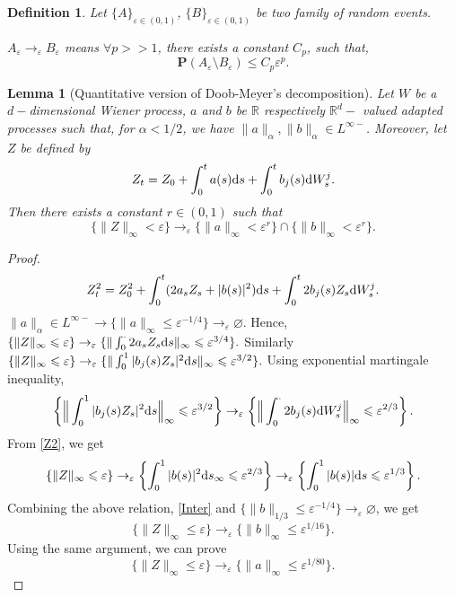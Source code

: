 \documentclass[twoside, 12pt]{book}
\numberwithin{equation}{chapter}
\newtheorem{lemma}[theorem]{Lemma}
\newtheorem{definition}[theorem]{Definition}
\def\mR{{\mathbb R}}
\def\bP{{\mathbf P}}
\def\leq{\leqslant}
\def\d{\text{\rm{d}}}
\def\eps{\varepsilon}
\begin{document}
	
	\begin{definition}
	Let $\{A\}_{\eps\in(0,1)}$, $\{B\}_{\eps\in(0,1)}$ be two family of random events. 
	
	$A_\eps \rightarrow_\eps B_\eps$ means $\forall p>>1$, there exists a constant $C_p$, such that, 
	$$\bP (A_\eps\setminus B_\eps)\leq C_p\eps^p. $$
	\end{definition}
	
	
	\begin{lemma}[Quantitative version of Doob-Meyer's decomposition]\label{Z-to-ab}
	Let $W$ be a $d-$dimensional Wiener process, $a$ and $b$ be $\mR$ respectively $\mR^d-$ valued adapted processes such that, for $\alpha <1/2$, we have $\|a\|_\alpha , \|b\|_\alpha \in L^{\infty-}$. Moreover, let $Z$ be defined by
	$$Z_t=Z_0+\int_0^t a(s)\d s+\int_0^t b_j(s)\d W^j_s. $$
	Then there exists a constant $r\in(0, 1)$ such that
	$$\{\|Z\|_\infty<\eps\} \rightarrow_\eps \{\|a\|_\infty<\eps^r\} \cap\{\|b\|_{\infty}< \eps^r\} .$$
	\end{lemma}
	\begin{proof}
		\begin{align}\label{Z2} Z_t^2=Z_0^2+\int_0^t (2a_sZ_s+|b(s)|^2)\d s+\int_0^t 2b_j(s) Z_s\d W^j_s. \end{align}
		$\|a\|_\alpha \in L^{\infty-}\rightarrow \{\|a\|_\infty\leq \eps^{-1/4}\}\rightarrow_\eps\varnothing. $ Hence, $\{ \|Z\|_\infty\leq \eps\}\rightarrow_\eps \{\|\int_0^\cdot 2a_sZ_s\d s\|_\infty \leq \eps^{3/4}\}. $ Similarly 
		$\{ \|Z\|_\infty\leq \eps\}\rightarrow_\eps \{\|\int_0^1 |b_j(s)Z_s|^2 \d s\|_\infty \leq \eps^{3/2}\}.$ Using exponential martingale inequality, 
		$$\left\{\Big\|\int_0^1 |b_j(s)Z_s|^2 \d s\Big\|_\infty  \leq \eps^{3/2}\right\}\rightarrow_\eps \left\{ \Big\|\int_0^\cdot  2b_j(s)\d W^j_s\Big\|_\infty \leq \eps^{2/3}\right\}. $$
		From \eqref{Z2}, we get 
		$$\{ \|Z\|_\infty\leq \eps\}\rightarrow_\eps \left\{\int_0^1 |b(s)|^2\d s_\infty\leq \eps^{2/3}\right\}\rightarrow_\eps \left\{\int_0^1 |b(s)|\d s\leq \eps^{1/3}\right\}. $$
		Combining the above relation, \eqref{Inter} and $\{\|b\|_{1/3}\leq \eps^{-1/4}\}\rightarrow_\eps\varnothing$, we get 
		$$\{ \|Z\|_\infty\leq \eps\}\rightarrow_\eps \{\|b\|_\infty\leq \eps^{1/16}\}. $$
		Using the same argument, we can prove 
		$$\{ \|Z\|_\infty\leq \eps\}\rightarrow_\eps \{\|a\|_\infty\leq \eps^{1/80}\}. $$
		
	\end{proof}
	
\end{document}
